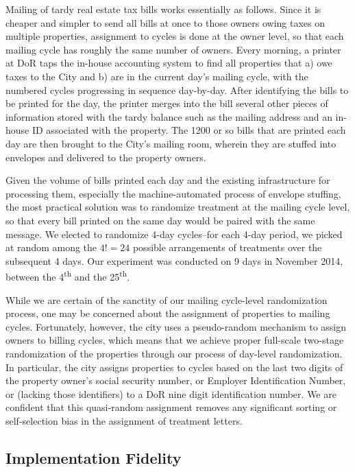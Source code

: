 \documentclass[12pt,titlepage]{article}
\begin{document}
Mailing of tardy real estate tax bills works essentially as follows.
Since it is cheaper and simpler to send all bills at once to
those owners owing taxes on multiple properties, assignment to cycles
is done at the owner level, so that each mailing cycle has roughly the
same number of owners.  Every morning, a printer at DoR taps the
in-house accounting system to find all properties that a) owe taxes to
the City and b) are in the current day's mailing cycle, with the
numbered cycles progressing in sequence day-by-day.  After identifying
the bills to be printed for the day, the printer merges into the bill
several other pieces of information stored with the tardy balance such
as the mailing address and an in-house ID associated with the
property. The 1200 or so bills that are printed each day are then
brought to the City's mailing room, wherein they are stuffed into
envelopes and delivered to the property owners.

Given the volume of bills printed each day and the existing
infrastructure for processing them, especially the machine-automated
process of envelope stuffing, the most practical
solution was to randomize treatment at the mailing cycle level,
so that every bill printed on the same day would be paired with the
same message.  We elected to randomize 4-day cycles--for each 4-day period,
we picked at random among the $4!=24$ possible arrangements of
treatments over the subsequent 4 days. Our experiment was conducted
on 9 days in November 2014, between the 4\textsuperscript{th} and
the 25\textsuperscript{th}.

While we are certain of the sanctity of our mailing cycle-level
randomization process, one may be concerned about the assignment of
properties to mailing cycles. Fortunately, however, the
city uses a pseudo-random mechanism to assign owners to billing
cycles, which means that we achieve proper full-scale two-stage
randomization of the properties through our process of day-level
randomization. In particular, the city assigns properties to cycles based on the last two digits of the property owner's social security number, or Employer Identification Number, or (lacking those identifiers) to a DoR nine digit identification number.  We are confident that this quasi-random assignment removes any significant sorting or self-selection bias in the assignment of treatment letters.  


\subsection{Implementation Fidelity}
\end{document}
